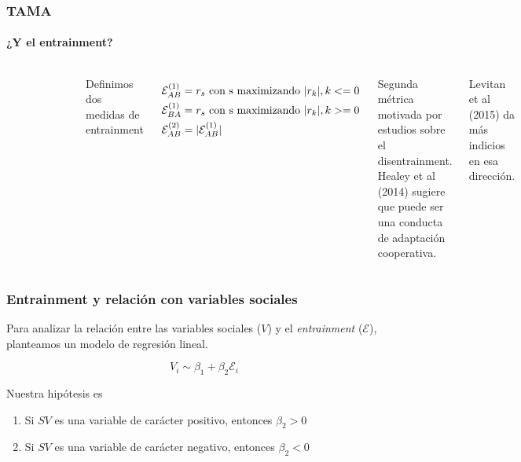 \begin{frame}
\frametitle{TAMA}
\framesubtitle{¿Y el entrainment?}

  \begin{columns}
    \begin{figure}[t]
      \includegraphics[scale=0.33]{images/cross_correlogram_2.png}
    \end{figure}

    Definimos dos medidas de entrainment

    \begin{align*}
      \mathcal{E}_{AB}^{(1)} &= r_s \text{ con s maximizando } |r_k|,  k <= 0  \\
      \mathcal{E}_{BA}^{(1)} &= r_s \text{ con s maximizando } |r_k|,  k >= 0  \\
      \mathcal{E}_{AB}^{(2)} &= |\mathcal{E}_{AB}^{(1)}|
    \end{align*}

    Segunda métrica motivada por estudios sobre el disentrainment. Healey et al (2014) sugiere que puede ser una conducta de adaptación cooperativa.

    Levitan et al (2015) da más indicios en esa dirección.
  \end{columns}
\end{frame}

\begin{frame}
\frametitle{Entrainment y relación con variables sociales}

  Para analizar la relación entre las variables sociales ($V$) y el \emph{entrainment} ($\mathcal{E}$), planteamos un modelo de regresión lineal.

    \begin{equation}
      V_i \sim \beta_1 + \beta_2 \mathcal{E}_i
    \end{equation}

  Nuestra hipótesis es

  \begin{enumerate}
    \item Si $SV$ es una variable de carácter positivo, entonces $\beta_2 > 0$
    \item Si $SV$ es una variable de carácter negativo, entonces $\beta_2 < 0$
  \end{enumerate}
\end{frame}
